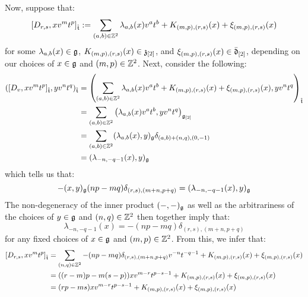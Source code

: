 \begin{remark}
\begin{itemize}
                    Now, suppose that:
                        $$[D_{r, s}, x v^m t^p]_{\hat{\mathfrak{t}}} := \sum_{(a, b) \in \mathbb{Z}^2} \lambda_{a, b}(x) v^a t^b + K_{(m, p), (r, s)}(x) + \xi_{(m, p), (r, s)}(x)$$
                    for some $\lambda_{a, b}(x) \in \mathfrak{g}$, $K_{(m, p), (r, s)}(x) \in \mathfrak{z}_{[2]}$, and $\xi_{(m, p), (r, s)}(x) \in \bar{\mathfrak{d}}_{[2]}$, depending on our choices of $x \in \mathfrak{g}$ and $(m, p) \in \mathbb{Z}^2$. Next, consider the following:
                        $$
                            \begin{aligned}
                                ( [D_v, x v^m t^p]_{\hat{\mathfrak{t}}}, y v^n t^q )_{\hat{\mathfrak{t}}} & = \left( \sum_{(a, b) \in \mathbb{Z}^2} \lambda_{a, b}(x) v^a t^b + K_{(m, p), (r, s)}(x) + \xi_{(m, p), (r, s)}(x), y v^n t^q \right)_{\hat{\mathfrak{t}}}
                                \\
                                & = \sum_{(a, b) \in \mathbb{Z}^2} \left( \lambda_{a, b}(x) v^a t^b, y v^n t^q \right)_{\mathfrak{g}_{[2]}}
                                \\
                                & = \sum_{(a, b) \in \mathbb{Z}^2} (\lambda_{a, b}(x), y)_{\mathfrak{g}} \delta_{ (a, b) + (n, q), (0, -1) }
                                \\
                                & = (\lambda_{-n, -q - 1}(x), y)_{\mathfrak{g}}
                            \end{aligned}
                        $$
                    which tells us that:
                        $$-(x, y)_{\mathfrak{g}} (np - mq) \delta_{(r, s), (m + n, p + q)} = (\lambda_{-n, -q - 1}(x), y)_{\mathfrak{g}}$$
                    The non-degeneracy of the inner product $(-, -)_{\mathfrak{g}}$ as well as the arbitrariness of the choices of $y \in \mathfrak{g}$ and $(n, q) \in \mathbb{Z}^2$ then together imply that:
                        $$\lambda_{-n, -q - 1}(x) = -(np - mq) \delta_{(r, s), (m + n, p + q)}$$
                    for any fixed choices of $x \in \mathfrak{g}$ and $(m, p) \in \mathbb{Z}^2$. From this, we infer that:
                        $$
                            \begin{aligned}
                                [D_{r, s}, x v^m t^p]_{\hat{\t}} & = \sum_{(n, q) \in \Z^2} -(np - mq) \delta_{(r, s), (m + n, p + q)} v^{-n} t^{-q - 1} + K_{(m, p), (r, s)}(x) + \xi_{(m, p), (r, s)}(x)
                                \\
                                & = ( (r - m)p - m(s - p) ) x v^{m - r} t^{p - s - 1} + K_{(m, p), (r, s)}(x) + \xi_{(m, p), (r, s)}(x)
                                \\
                                & = ( rp - ms ) x v^{m - r} t^{p - s - 1} + K_{(m, p), (r, s)}(x) + \xi_{(m, p), (r, s)}(x)
                            \end{aligned}
                        $$
                        

\end{itemize}
\end{remark}
